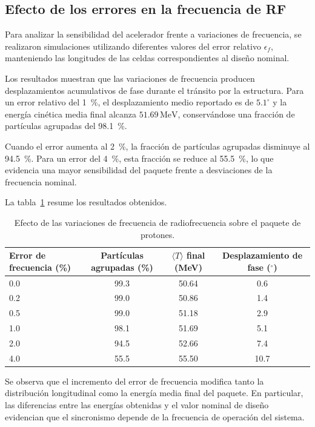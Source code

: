 \subsection{Efecto de los errores en la frecuencia de RF}

Para analizar la sensibilidad del acelerador frente a variaciones de frecuencia, se realizaron simulaciones utilizando diferentes valores del error relativo $\epsilon_f$, manteniendo las longitudes de las celdas correspondientes al diseño nominal.

Los resultados muestran que las variaciones de frecuencia producen desplazamientos acumulativos de fase durante el tránsito por la estructura. Para un error relativo del \SI{1}{\percent}, el desplazamiento medio reportado es de $5.1^\circ$ y la energía cinética media final alcanza $51.69\,\mathrm{MeV}$, conservándose una fracción de partículas agrupadas del \SI{98.1}{\percent}.

Cuando el error aumenta al \SI{2}{\percent}, la fracción de partículas agrupadas disminuye al \SI{94.5}{\percent}. Para un error del \SI{4}{\percent}, esta fracción se reduce al \SI{55.5}{\percent}, lo que evidencia una mayor sensibilidad del paquete frente a desviaciones de la frecuencia nominal.

La tabla~\ref{tab:errorf} resume los resultados obtenidos.

\begin{table}[H]
\centering
\caption{Efecto de las variaciones de frecuencia de radiofrecuencia sobre el paquete de protones.}
\label{tab:errorf}
\small
\begin{tabular}{lccc}
\toprule
Error de frecuencia (\%) &
Partículas agrupadas (\%) &
$\langle T\rangle$ final (MeV) &
Desplazamiento de fase ($^\circ$) \\
\midrule
0.0 & 99.3 & 50.64 & 0.6 \\
0.2 & 99.0 & 50.86 & 1.4 \\
0.5 & 99.0 & 51.18 & 2.9 \\
1.0 & 98.1 & 51.69 & 5.1 \\
2.0 & 94.5 & 52.66 & 7.4 \\
4.0 & 55.5 & 55.50 & 10.7 \\
\bottomrule
\end{tabular}
\end{table}

Se observa que el incremento del error de frecuencia modifica tanto la distribución longitudinal como la energía media final del paquete. En particular, las diferencias entre las energías obtenidas y el valor nominal de diseño evidencian que el sincronismo depende de la frecuencia de operación del sistema.

